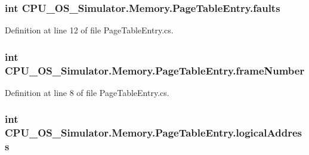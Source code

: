 \subsubsection[{faults}]{\setlength{\rightskip}{0pt plus 5cm}int C\+P\+U\+\_\+\+O\+S\+\_\+\+Simulator.\+Memory.\+Page\+Table\+Entry.\+faults\hspace{0.3cm}{\ttfamily [private]}}\label{class_c_p_u___o_s___simulator_1_1_memory_1_1_page_table_entry_a7aefba3f2cb43ba3d9cb37e659d90d44}


Definition at line 12 of file Page\+Table\+Entry.\+cs.

\hypertarget{class_c_p_u___o_s___simulator_1_1_memory_1_1_page_table_entry_ab3e63e9a522928053429134a5da1be6f}{}
\subsubsection[{frame\+Number}]{\setlength{\rightskip}{0pt plus 5cm}int C\+P\+U\+\_\+\+O\+S\+\_\+\+Simulator.\+Memory.\+Page\+Table\+Entry.\+frame\+Number\hspace{0.3cm}{\ttfamily [private]}}\label{class_c_p_u___o_s___simulator_1_1_memory_1_1_page_table_entry_ab3e63e9a522928053429134a5da1be6f}


Definition at line 8 of file Page\+Table\+Entry.\+cs.

\hypertarget{class_c_p_u___o_s___simulator_1_1_memory_1_1_page_table_entry_a8450b36db4a744e50336172e5d4b46b2}{}
\subsubsection[{logical\+Address}]{\setlength{\rightskip}{0pt plus 5cm}int C\+P\+U\+\_\+\+O\+S\+\_\+\+Simulator.\+Memory.\+Page\+Table\+Entry.\+logical\+Address\hspace{0.3cm}{\ttfamily [private]}}\label{class_c_p_u___o_s___simulator_1_1_memory_1_1_page_table_entry_a8450b36db4a744e50336172e5d4b46b2}


